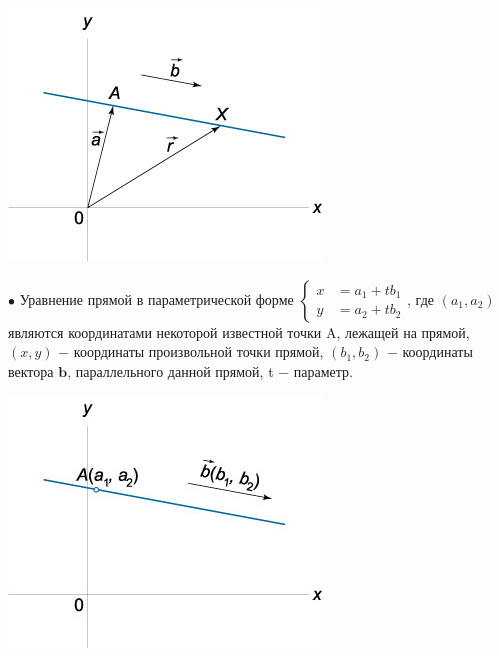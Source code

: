\documentclass[oneside]{book}
\begin{document}
\begin{itemize}
\begin{enumerate}
\begin{center}
\includegraphics[scale=0.4]{./pics/12.jpg}
\end{center}

$\bullet$ Уравнение прямой в параметрической форме
$\left\{ \begin{aligned} x &= {a_1} + t{b_1} \\ y &= {a_2} + t{b_2} \end{aligned} \right.$,
где $\left( {{a_1},{a_2}} \right)$ являются координатами некоторой известной точки A, лежащей на прямой, $\left( {x,y} \right)$ − координаты произвольной точки прямой, $\left( {{b_1},{b_2}} \right)$ − координаты вектора $\mathbf{b}$, параллельного данной прямой, t − параметр.
\begin{center}
\includegraphics[scale=0.4]{./pics/13.jpg}
\end{center}


\end{enumerate}
\end{itemize}
\end{document}
